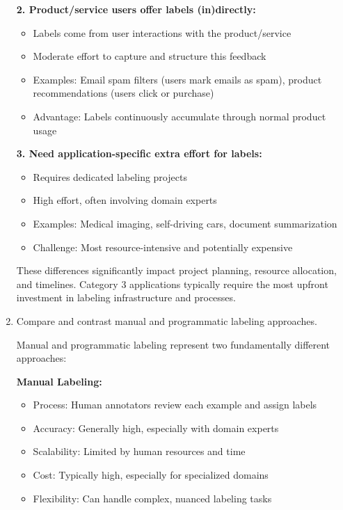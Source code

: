 \documentclass[12pt]{article}
\begin{document}
\begin{enumerate}
\begin{tcolorbox}[colback=blue!5!white,colframe=blue!75!black,title={Solution}]
    \textbf{2. Product/service users offer labels (in)directly:}
    \begin{itemize}
        \item Labels come from user interactions with the product/service
        \item Moderate effort to capture and structure this feedback
        \item Examples: Email spam filters (users mark emails as spam), product recommendations (users click or purchase)
        \item Advantage: Labels continuously accumulate through normal product usage
    \end{itemize}
    
    \textbf{3. Need application-specific extra effort for labels:}
    \begin{itemize}
        \item Requires dedicated labeling projects
        \item High effort, often involving domain experts
        \item Examples: Medical imaging, self-driving cars, document summarization
        \item Challenge: Most resource-intensive and potentially expensive
    \end{itemize}
    
    These differences significantly impact project planning, resource allocation, and timelines. Category 3 applications typically require the most upfront investment in labeling infrastructure and processes.
    \end{tcolorbox}
    
    \item Compare and contrast manual and programmatic labeling approaches.
    
    \begin{tcolorbox}[colback=blue!5!white,colframe=blue!75!black,title={Solution}]
    Manual and programmatic labeling represent two fundamentally different approaches:
    
    \textbf{Manual Labeling:}
    \begin{itemize}
        \item Process: Human annotators review each example and assign labels
        \item Accuracy: Generally high, especially with domain experts
        \item Scalability: Limited by human resources and time
        \item Cost: Typically high, especially for specialized domains
        \item Flexibility: Can handle complex, nuanced labeling tasks
    \end{itemize}
    

\end{tcolorbox}
\end{enumerate}
\end{document}
